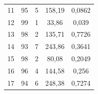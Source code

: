 \begin{table}[!ht]
\begin{tabular}{|l||c|c|c|c|}
11                                                                                & 95                                                    & 5                                                     & 158,19                                                                 & 0,0862                                                                        \\ \cline{1-5}
12                                                                                & 99                                                    & 1                                                     & 33,86                                                                  & 0,039                                                                         \\ \cline{1-5}
13                                                                                & 98                                                    & 2                                                     & 135,71                                                                 & 0,7726                                                                        \\ \cline{1-5}
14                                                                                & 93                                                    & 7                                                     & 243,86                                                                 & 0,3641                                                                        \\ \cline{1-5}
15                                                                                & 98                                                    & 2                                                     & 80,08                                                                  & 0,2049                                                                        \\ \cline{1-5}
16                                                                                & 96                                                    & 4                                                     & 144,58                                                                 & 0,256                                                                         \\ \cline{1-5}
17                                                                                & 94                                                    & 6                                                     & 248,38                                                                 & 0,7274                                                                        \\ \cline{1-5}

\end{tabular}
\end{table}
